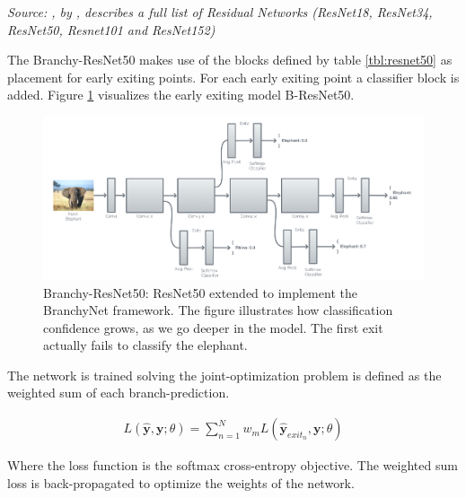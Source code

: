 	\vspace{-20pt} \textit{Source: , by \citeauthor{he_deep_2015} \cite{he_deep_2015}, describes a full list of Residual Networks (ResNet18, ResNet34, ResNet50, Resnet101 and ResNet152)}


The Branchy-ResNet50 makes use of the blocks defined by table \ref{tbl:resnet50} as placement for early exiting points. For each early exiting point a classifier block is added. Figure \ref{fig:b-resnet} visualizes the early exiting model B-ResNet50.

\begin{figure}
	\centering
	\includegraphics[width=\linewidth]{figures/models/BResNet.png}
	\caption[B-ResNet architecture]{Branchy-ResNet50: ResNet50 extended to implement the BranchyNet framework. The figure illustrates how classification confidence grows, as we go deeper in the model. The first exit actually fails to classify the elephant. }
	\label{fig:b-resnet}
\end{figure}

The network is trained solving the joint-optimization problem is defined as the weighted sum of each branch-prediction.

\begin{align*}
	L(\hat{\mathbf{y}},\mathbf{y};\theta) = \sum_{n=1}^{N} w_m L(\hat{\mathbf{y}}_{exit_n},\mathbf{y};\theta)
\end{align*}

Where the loss function is the softmax cross-entropy objective.
The weighted sum loss is back-propagated to optimize the weights of the network. 